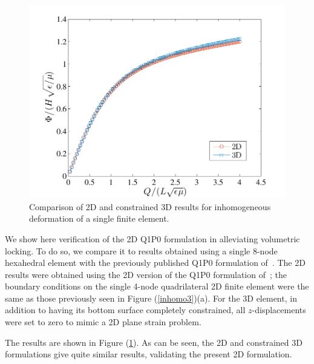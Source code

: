 \documentclass[final,authoryear,3p,times,twocolumn]{elsarticle}
\begin{document}
\begin{figure} \begin{center} 
\includegraphics[scale=0.8]{pics/2d3d.pdf}
\caption{Comparison of 2D and constrained 3D results for inhomogeneous deformation of a single finite element.}
\label{2d3d} \end{center} \end{figure}

We show here verification of the 2D Q1P0 formulation in alleviating volumetric locking.  To do so, we compare it to results obtained using a single 8-node hexahedral element with the previously published Q1P0 formulation of~\citet{parkCMAME2013}.  The 2D results were obtained using the 2D version of the Q1P0 formulation of~\citet{simoCMAME1985}; the boundary conditions on the single 4-node quadrilateral 2D finite element were the same as those previously seen in Figure (\ref{inhomo3})(a).  For the 3D element, in addition to having its bottom surface completely constrained, all $z$-displacements were set to zero to mimic a 2D plane strain problem.  

The results are shown in Figure (\ref{2d3d}).  As can be seen, the 2D and constrained 3D formulations give quite similar results, validating the present 2D formulation.



\end{document}
